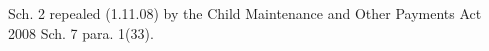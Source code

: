 \documentclass[12pt,a4paper]{article}
\begin{document}
{Sch. 2 repealed (1.11.08) by the Child Maintenance and Other Payments Act 2008 Sch. 7 para. 1(33).
%
%
%
%
%
%
%
%
%
%
%
}
\end{document}
